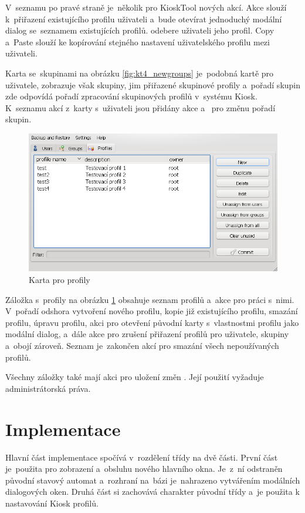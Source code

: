 V~seznamu po pravé straně je~několik pro KioskTool nových akcí. Akce  slouží k~přiřazení existujícího profilu uživateli a~bude otevírat jednoduchý modální dialog se~seznamem existujících profilů.  odebere uživateli jeho profil. Copy a~Paste slouží ke kopírování stejného nastavení uživatelského profilu mezi uživateli.

Karta se~skupinami na obrázku \ref{fig:kt4_newgroups} je~podobná kartě pro uživatele, zobrazuje však skupiny, jim přiřazené skupinové profily a~pořadí skupin zde odpovídá pořadí zpracování skupinových profilů v~systému Kiosk. K~seznamu akcí z~karty s~uživateli jsou přidány akce  a~ pro změnu pořadí skupin.

\begin{figure}[h]
    \centering
    \includegraphics[width=13cm]{obrazky/navrh-profiles-fixd.png}
    \caption{Karta pro profily}
    \label{fig:kt4_newprofiles}
\end{figure}

Záložka s~profily na obrázku \ref{fig:kt4_newprofiles} obsahuje seznam profilů a~akce pro práci s~nimi. V~pořadí odshora vytvoření nového profilu, kopie již existujícího profilu, smazání profilu, úpravu profilu, akci pro otevření původní karty s~vlastnostmi profilu jako modální dialog, a~dále akce pro zrušení přiřazení profilů pro uživatele, skupiny a~obojí zároveň. Seznam je~zakončen akcí pro smazání všech nepoužívaných profilů.

Všechny záložky také mají akci pro uložení změn . Její použití vyžaduje administrátorská práva.

\section{Implementace}
Hlavní část implementace spočívá v~rozdělení třídy  na dvě části. První část je~použita pro zobrazení a~obsluhu nového hlavního okna. Je~z~ní odstraněn původní stavový automat a~rozhraní na~bázi  je~nahrazeno vytvářením modálních dialogových oken. Druhá část si zachovává charakter původní třídy  a~je použita k nastavování Kiosk profilů.

